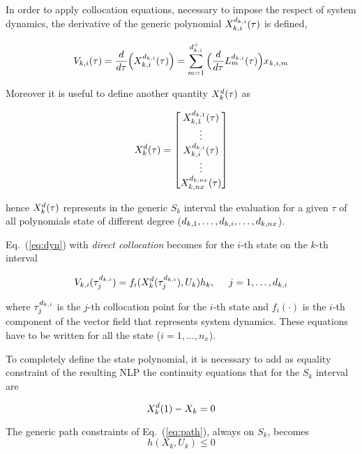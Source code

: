 In order to apply collocation equations, necessary to impose the respect of system dynamics, the derivative of the generic polynomial $X_{k,i}^{d_{k,i}} (\tau)$ is defined,

\begin{equation}
V_{k,i} (\tau) = \frac{d}{d\tau}\Big(X_{k,i}^{d_{k,i}}(\tau)\Big) = \sum_{m=1}^{d_{k,i}^{+}}\Big(\frac{d}{d\tau}L_{m}^{d_{k,i}}(\tau)\Big)x_{k,i,m}
\end{equation}

Moreover it is useful to define another quantity $X_{k}^{d} (\tau)$ as

\begin{equation}
X_{k}^{d}(\tau) =  
\begin{bmatrix}
X_{k,1}^{d_{k,1}}(\tau) \\
\vdots \\
X_{k,i}^{d_{k,i}}(\tau)\\
\vdots \\
X_{k,nx}^{d_{k,nx}}(\tau)
\end{bmatrix}
\end{equation}

hence $X_{k}^{d} (\tau)$ represents in the generic $S_k$ interval the evaluation for a given $\tau$ of all polynomials state of different degree ($d_{k,1}, \dots, d_{k,i}, \dots, d_{k,nx}$).

Eq.~(\ref{eq:dyn}) with \emph{direct collocation} becomes for the $i$-th state on the $k$-th interval

\begin{equation}\label{eq:colloc}
V_{k,i}(\tau_{j}^{d_{k,i}}) = f_i(X_{k}^{d}(\tau_{j}^{d_{k,i}}),  U_k) h_{k}, \hspace{5mm} j = 1, \dots, d_{k,i}
\end{equation}

where $\tau_{j}^{d_{k,i}}$ is the $j$-th collocation point for the $i$-th state and $f_i(\cdot)$ is the $i$-th component of the vector field that represents system dynamics. These equations have to be written for all the state ($i = 1, \dots, n_x$).

To completely define the state polynomial, it is necessary to add as equality constraint of the resulting NLP the continuity equations that for the $S_k$ interval are

\begin{equation}\label{eq:continuity}
X_{k}^{d}(1) - X_k = 0
\end{equation}

The generic path constraints of Eq.~(\ref{eq:path}), always on $S_k$, becomes
\begin{equation}\label{eq:nlpath}
h(X_k, U_k) \leq 0
\end{equation}

